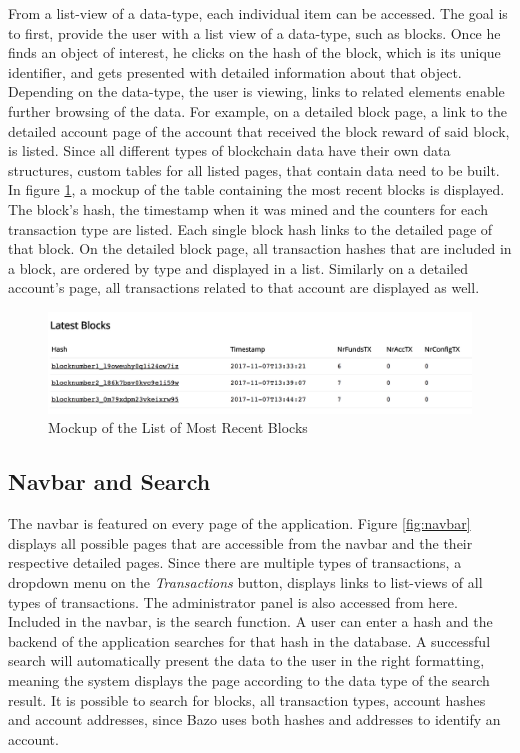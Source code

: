 From a list-view of a data-type, each individual item can be accessed. The goal is to first, provide the user with a list view of a data-type, such as blocks. Once he finds an object of interest, he clicks on the hash of the block, which is its unique identifier, and gets presented with detailed information about that object. Depending on the data-type, the user is viewing, links to related elements enable further browsing of the data. For example, on a detailed block page, a link to the detailed account page of the account that received the block reward of said block, is listed. Since all different types of blockchain data have their own data structures, custom tables for all listed pages, that contain data need to be built. In figure \ref{fig:mockup1}, a mockup of the table containing the most recent blocks is displayed. The block's hash, the timestamp when it was mined and the counters for each transaction type are listed. Each single block hash links to the detailed page of that block. On the detailed block page, all transaction hashes that are included in a block, are ordered by type and displayed in a list. Similarly on a detailed account's page, all transactions related to that account are displayed as well.

\begin{figure}
  \includegraphics[width=\linewidth]{mockup1.png}
  \centering
  \caption{Mockup of the List of Most Recent Blocks}
  \label{fig:mockup1}
\end{figure}

\subsection{Navbar and Search}

The navbar is featured on every page of the application. Figure \ref{fig:navbar} displays all possible pages that are accessible from the navbar and the their respective detailed pages. Since there are multiple types of transactions, a dropdown menu on the \emph{Transactions} button, displays links to list-views of all types of transactions. The administrator panel is also accessed from here. Included in the navbar, is the search function. A user can enter a hash and the backend of the application searches for that hash in the database. A successful search will automatically present the data to the user in the right formatting, meaning the system displays the page according to the data type of the search result. It is possible to search for blocks, all transaction types, account hashes and account addresses, since Bazo uses both hashes and addresses to identify an account.

